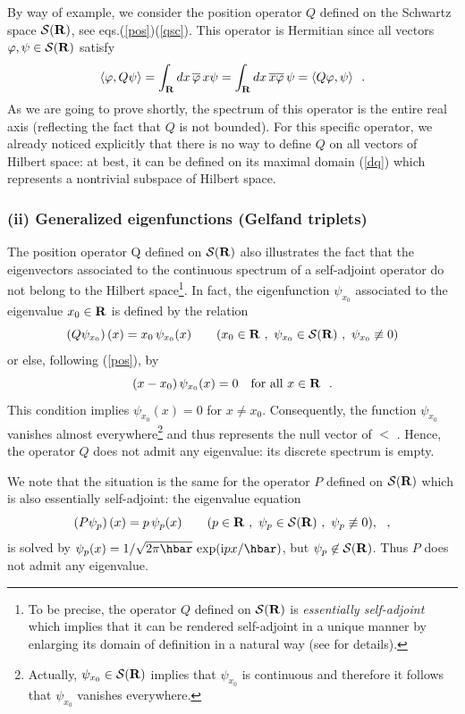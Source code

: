 \documentclass[12pt]{report}
\begin{document}
By way of example, we consider the position operator 
$Q$ defined on the Schwartz space ${\cal S}({\bf R})$, see 
eqs.(\ref{pos})(\ref{qsc}). 
This operator is Hermitian since all vectors 
$\varphi, \psi \in {\cal S}({\bf R})$ satisfy
\[
\langle \varphi , Q \psi \rangle 
= \int_{{\bf R}} dx \, \overline{\varphi} \, x \psi 
= \int_{{\bf R}} dx \, \overline{x \varphi} \, \psi 
= \langle Q \varphi ,  \psi \rangle
\ \ . 
\]
As we are going to prove shortly, the spectrum of 
this operator is the entire real axis (reflecting the fact that 
$Q$ is not bounded). 
For this specific operator, we already noticed  
explicitly that there is no way to define $Q$  
on all vectors of Hilbert space: at best, it can be defined 
on its maximal domain (\ref{dq})
which represents a nontrivial subspace of Hilbert space. 


 
 
\subsubsection{(ii) Generalized eigenfunctions (Gelfand triplets)}
 
The position operator Q defined on ${\cal S}({\bf R})$ also illustrates
the fact that the eigenvectors associated to the continuous spectrum  
of a self-adjoint operator do not belong to the Hilbert 
space\footnote{To be precise, the operator $Q$ 
defined on ${\cal S}({\bf R})$ is {\it essentially self-adjoint}
which implies that it can be rendered self-adjoint in a unique manner 
by enlarging its domain of definition in a natural way 
(see \cite{rs, sg} for details).}.
In fact, the eigenfunction $\psi_{x_0}$ associated to the 
eigenvalue $x_0 \in {\bf R}$ is defined by the 
relation
\begin{equation}
\label{vpq}
\left( Q \psi_{x_0} \right) (x) = x_0 \, \psi_{x_0} (x)
\qquad (x_0 \in {\bf R} \ ,  \ \psi_{x_0} \in {\cal S}({\bf R}) \ , \
\psi_{x_0} \not \equiv 0 )
\end{equation}
or else, following (\ref{pos}), by 
\[
(x-x_0) \, \psi_{x_0} (x) = 0
\quad  \mbox{for all  $x\in {\bf R}$}
\ \ .
\]
 This condition implies 
$\psi_{x_0} (x) =0$ for $x \neq x_0$. 
Consequently, the function $\psi_{x_0}$ vanishes almost 
everywhere\footnote{Actually, $\psi_{x_0} \in {\cal S}({\bf R})$
implies that $\psi_{x_0}$ is continuous and therefore 
it follows that $\psi_{x_0}$ vanishes everywhere.} 
and thus represents the null vector of 
$\lt$ \cite{sg, af, rs}. 
 Hence, the operator $Q$ does not admit any eigenvalue:
its discrete spectrum is empty. 

We note that the situation is the same for the operator $P$
defined on ${\cal S}({\bf R})$ which is also essentially self-adjoint: 
the eigenvalue equation 
\[
\left( P\psi_p \right) (x) = p \, \psi_p (x)
\qquad ( p \in {\bf R} \ , \ \psi_p \in {\cal S}({\bf R}) \ , \
\psi_p \not \equiv 0 ),
\ \ ,
\]
is solved by $\psi_p (x) = 1/\sqrt{2\pi \hbar}
\  {\rm exp} (\ri px / \hbar )$, but 
$\psi_p \not \in {\cal S}({\bf R})$.
Thus $P$ does not admit any eigenvalue. 
\end{document}
